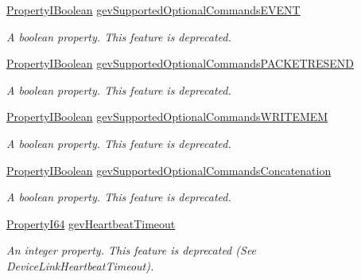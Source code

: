 \begin{DoxyCompactItemize}
\hyperlink{group___common_interface_ga44f9437e24b21b6c93da9039ec6786aa}{Property\+I\+Boolean} \hyperlink{classmv_i_m_p_a_c_t_1_1acquire_1_1_gen_i_cam_1_1_transport_layer_control_a76ed5e2120488e583cec4b9bbe4a5cdc}{gev\+Supported\+Optional\+Commands\+E\+V\+E\+N\+T}
\begin{DoxyCompactList}\small\item\em A boolean property. This feature is deprecated. \end{DoxyCompactList}\item 
\hyperlink{group___common_interface_ga44f9437e24b21b6c93da9039ec6786aa}{Property\+I\+Boolean} \hyperlink{classmv_i_m_p_a_c_t_1_1acquire_1_1_gen_i_cam_1_1_transport_layer_control_a5a78f93d6fc83317d48e07f9046a9d68}{gev\+Supported\+Optional\+Commands\+P\+A\+C\+K\+E\+T\+R\+E\+S\+E\+N\+D}
\begin{DoxyCompactList}\small\item\em A boolean property. This feature is deprecated. \end{DoxyCompactList}\item 
\hyperlink{group___common_interface_ga44f9437e24b21b6c93da9039ec6786aa}{Property\+I\+Boolean} \hyperlink{classmv_i_m_p_a_c_t_1_1acquire_1_1_gen_i_cam_1_1_transport_layer_control_a07c5096c618fdce89f909b513d93dd30}{gev\+Supported\+Optional\+Commands\+W\+R\+I\+T\+E\+M\+E\+M}
\begin{DoxyCompactList}\small\item\em A boolean property. This feature is deprecated. \end{DoxyCompactList}\item 
\hyperlink{group___common_interface_ga44f9437e24b21b6c93da9039ec6786aa}{Property\+I\+Boolean} \hyperlink{classmv_i_m_p_a_c_t_1_1acquire_1_1_gen_i_cam_1_1_transport_layer_control_ac6db9549161cbc471f29b47115bb0126}{gev\+Supported\+Optional\+Commands\+Concatenation}
\begin{DoxyCompactList}\small\item\em A boolean property. This feature is deprecated. \end{DoxyCompactList}\item 
\hyperlink{group___common_interface_ga81749b2696755513663492664a18a893}{Property\+I64} \hyperlink{classmv_i_m_p_a_c_t_1_1acquire_1_1_gen_i_cam_1_1_transport_layer_control_a4c02bd7723507996e0833eba3a0a2282}{gev\+Heartbeat\+Timeout}
\begin{DoxyCompactList}\small\item\em An integer property. This feature is deprecated (See Device\+Link\+Heartbeat\+Timeout). \end{DoxyCompactList}\item 

\end{DoxyCompactItemize}
